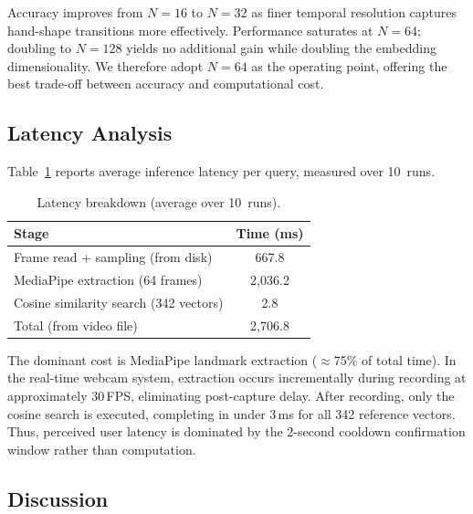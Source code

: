 \documentclass[runningheads]{llncs}
\begin{document}
Accuracy improves from $N = 16$ to $N = 32$ as finer temporal
resolution captures hand-shape transitions more effectively.
Performance saturates at $N = 64$; doubling to $N = 128$ yields no
additional gain while doubling the embedding dimensionality.
We therefore adopt $N = 64$ as the operating point, offering the best
trade-off between accuracy and computational cost.

\subsection{Latency Analysis}\label{sec:latency}

Table~\ref{tab:latency} reports average inference latency per query,
measured over 10~runs.

\begin{table}[t]
\centering
\caption{Latency breakdown (average over 10~runs).}
\label{tab:latency}
\begin{tabular}{@{}lc@{}}
\toprule
Stage & Time (ms) \\
\midrule
Frame read + sampling (from disk)    & 667.8 \\
MediaPipe extraction (64 frames)     & 2{,}036.2 \\
Cosine similarity search (342 vectors) & 2.8 \\
\midrule
Total (from video file)              & 2{,}706.8 \\
\bottomrule
\end{tabular}
\end{table}

The dominant cost is MediaPipe landmark extraction ($\approx$75\% of
total time).
In the real-time webcam system, extraction occurs incrementally during
recording at approximately 30\,FPS, eliminating post-capture delay.
After recording, only the cosine search is executed, completing in under
3\,ms for all 342 reference vectors.
Thus, perceived user latency is dominated by the 2-second cooldown
confirmation window rather than computation.

\subsection{Discussion}\label{sec:discussion}
\end{document}
